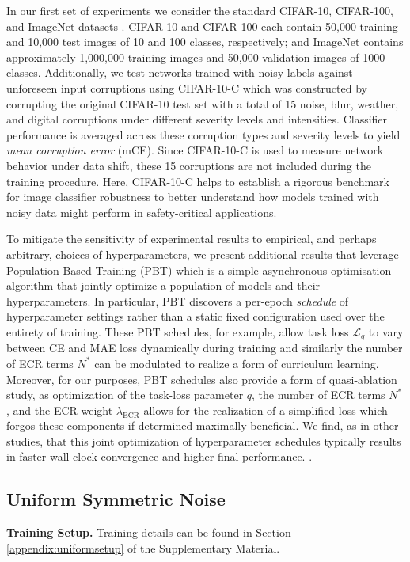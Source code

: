 \documentclass{article}
\DeclareMathOperator{\ECR}{ECR}
\begin{document}
In our first set of experiments we consider the standard CIFAR-10, CIFAR-100, and ImageNet datasets \cite{Krizhevsky2009LearningML,deng2009}. CIFAR-10 and CIFAR-100 each contain 50,000 training and 10,000 test images of 10 and 100 classes, respectively; and ImageNet contains approximately 1,000,000 training images and 50,000 validation images of 1000 classes. Additionally, we test networks trained with noisy labels against unforeseen input corruptions using CIFAR-10-C \cite{hendrycks2019robustness} which was constructed by corrupting the original CIFAR-10 test set with a total of 15 noise, blur, weather, and digital corruptions under different severity levels and intensities.  Classifier performance is averaged across these corruption types and severity levels to yield \emph{mean corruption error} (mCE).  Since CIFAR-10-C is used to measure network behavior under data shift, these 15 corruptions are not included during the training procedure.  Here, CIFAR-10-C helps to establish a rigorous benchmark for image classifier robustness to better understand how models trained with noisy data might perform in safety-critical applications.

To mitigate the sensitivity of experimental results to empirical, and perhaps arbitrary, choices of hyperparameters, we present additional results that leverage Population Based Training (PBT) \cite{2017arXiv171109846J, 2019arXiv190201894L} which is a simple asynchronous optimisation algorithm that jointly optimize a population of models and their hyperparameters.  In particular, PBT discovers a per-epoch \emph{schedule} of hyperparameter settings rather than a static fixed configuration used over the entirety of training.  These PBT schedules, for example, allow task loss $\mathcal{L}_q$ to vary between CE and MAE loss dynamically during training and similarly the number of ECR terms $N^*$ can be modulated to realize a form of curriculum learning.  Moreover, for our purposes, PBT schedules also provide a form of quasi-ablation study, as optimization of the task-loss parameter $q$, the number of ECR terms $N^*$, and the ECR weight $\lambda_{\ECR}$ allows for the realization of a simplified loss which forgos these components if determined maximally beneficial.  We find, as in other studies, that this joint optimization of hyperparameter schedules typically results in faster wall-clock convergence and higher final performance. \cite{2019arXiv190505393H,2019arXiv190201894L}.

\subsection{Uniform Symmetric Noise}
\label{sec:expt:us}
\textbf{Training Setup.} Training details can be found in Section \ref{appendix:uniformsetup} of the Supplementary Material.
\end{document}
